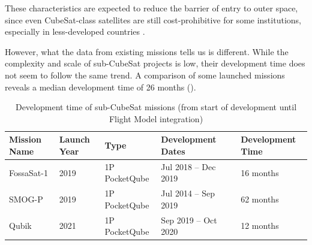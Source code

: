 \documentclass[journal,10pt]{IEEEtran}
\begin{document}
These characteristics are expected to reduce the barrier of entry to outer space, since even CubeSat-class satellites are still cost-prohibitive for some institutions, especially in less-developed countries \autocite{bouwmeesterUtilityConstraintsPocketQubes2020}.

However, what the data from existing missions tells us is different. While the complexity and scale of sub-CubeSat projects is low, their development time does not seem to follow the same trend. A comparison of some launched missions reveals a median development time
of 26 months ().

	\begin{table}[h]
		\caption{Development time of sub-CubeSat missions (from start of development until Flight Model integration)}
		\label{tab:otherdevtime}
		\centering
		\begin{tabular}{llll@{\hskip 0.5em}ll}
		\hline
		Mission Name & Launch Year & Type & Development Dates & & Development Time \\ \hline
		FossaSat-1 & 2019 & 1P PocketQube & Jul 2018 -- Dec 2019&  \autocite{fossasat-1GithubCommits} & 16 months \\
		SMOG-P & 2019 & 1P PocketQube & Jul 2014 -- Sep 2019 & \autocite{SMOG14thHungarian2021} & 62 months \\
		Qubik & 2021 & 1P PocketQube & Sep 2019 -- Oct 2020 & \autocite{triantafyllopoulouQUBIKProjectReady2020} & 12 months \\

\end{tabular}
\end{table}
\end{document}
